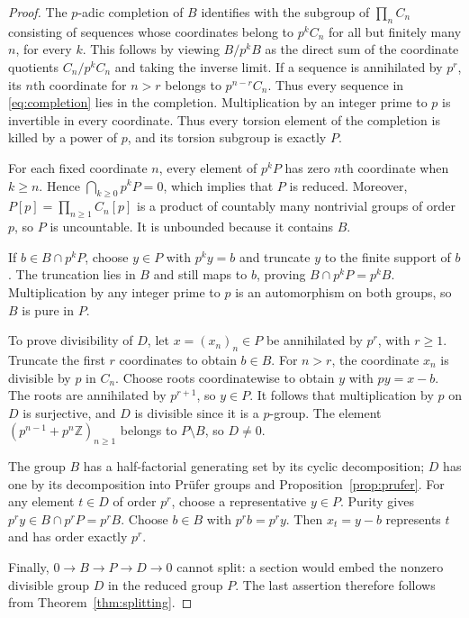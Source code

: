 \documentclass[11pt,reqno]{amsart}
\numberwithin{equation}{section}
\theoremstyle{definition}
\theoremstyle{remark}
\newcommand{\Z}{\mathbb Z}
\begin{document}
\begin{proof}
The $p$-adic completion of $B$ identifies with the subgroup of
$\prod_n C_n$ consisting of sequences whose coordinates belong to
$p^kC_n$ for all but finitely many $n$, for every $k$.
This follows by viewing $B/p^kB$ as the direct sum of the
coordinate quotients $C_n/p^kC_n$ and taking the inverse limit.
If a sequence is annihilated by $p^r$, its $n$th coordinate for
$n>r$ belongs to $p^{n-r}C_n$. Thus every sequence in
\eqref{eq:completion} lies in the completion. Multiplication by an integer prime to $p$ is invertible in every
coordinate. Thus every torsion element of the completion is killed
by a power of $p$, and its torsion subgroup is exactly $P$.

For each fixed coordinate $n$, every element of $p^kP$ has zero
$n$th coordinate when $k\ge n$. Hence
$\bigcap_{k\ge0}p^kP=0$, which implies that $P$ is reduced.
Moreover, $P[p]=\prod_{n\ge1}C_n[p]$ is a product of countably
many nontrivial groups of order $p$, so $P$ is uncountable.
It is unbounded because it contains $B$.

If $b\in B\cap p^kP$, choose $y\in P$ with $p^ky=b$ and
truncate $y$ to the finite support of $b$. The truncation lies in
$B$ and still maps to $b$, proving $B\cap p^kP=p^kB$.
Multiplication by any integer prime to $p$ is an automorphism on
both groups, so $B$ is pure in $P$.

To prove divisibility of $D$, let $x=(x_n)_n\in P$ be annihilated
by $p^r$, with $r\ge1$. Truncate the first $r$ coordinates to
obtain $b\in B$. For $n>r$, the coordinate $x_n$ is divisible
by $p$ in $C_n$. Choose roots coordinatewise to obtain $y$ with
$py=x-b$. The roots are annihilated by $p^{r+1}$, so $y\in P$.
It follows that multiplication by $p$ on $D$ is surjective, and
$D$ is divisible since it is a $p$-group. The element
$(p^{n-1}+p^n\Z)_{n\ge1}$ belongs to $P\setminus B$, so
$D\ne0$.

The group $B$ has a half-factorial generating set by its cyclic
decomposition; $D$ has one by its decomposition into Pr\"ufer
groups and Proposition~\ref{prop:prufer}. For any element
$t\in D$ of order $p^r$, choose a representative $y\in P$.
Purity gives
$p^ry\in B\cap p^rP=p^rB$. Choose $b\in B$ with
$p^rb=p^ry$. Then $x_t=y-b$ represents $t$ and has order exactly
$p^r$.

Finally, $0\to B\to P\to D\to0$ cannot split: a section would
embed the nonzero divisible group $D$ in the reduced group $P$.
The last assertion therefore follows from
Theorem~\ref{thm:splitting}.
\end{proof}
\end{document}
